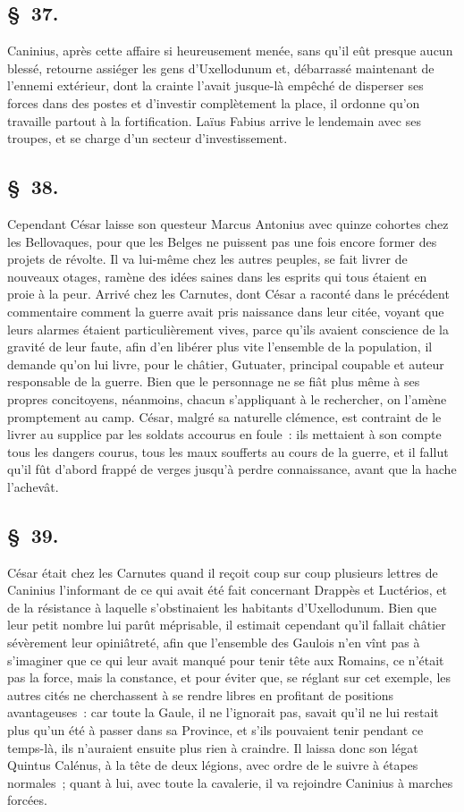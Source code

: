 \documentclass[french,twoside]{book} %
\begin{document}
\subsection[{§ 37.}]{ \textsc{§ 37.} }
\noindent Caninius, après cette affaire si heureusement menée, sans qu’il eût presque aucun blessé, retourne assiéger les gens d’Uxellodunum et, débarrassé maintenant de l’ennemi extérieur, dont la crainte l’avait jusque-là empêché de disperser ses forces dans des postes et d’investir complètement la place, il ordonne qu’on travaille partout à la fortification. Laïus Fabius arrive le lendemain avec ses troupes, et se charge d’un secteur d’investissement.
\subsection[{§ 38.}]{ \textsc{§ 38.} }
\noindent Cependant César laisse son questeur Marcus Antonius avec quinze cohortes chez les Bellovaques, pour que les Belges ne puissent pas une fois encore former des projets de révolte. Il va lui-même chez les autres peuples, se fait livrer de nouveaux otages, ramène des idées saines dans les esprits qui tous étaient en proie à la peur. Arrivé chez les Carnutes, dont César a raconté dans le précédent commentaire comment la guerre avait pris naissance dans leur citée, voyant que leurs alarmes étaient particulièrement vives, parce qu’ils avaient conscience de la gravité de leur faute, afin d’en libérer plus vite l’ensemble de la population, il demande qu’on lui livre, pour le châtier, Gutuater, principal coupable et auteur responsable de la guerre. Bien que le personnage ne se fiât plus même à ses propres concitoyens, néanmoins, chacun s’appliquant à le rechercher, on l’amène promptement au camp. César, malgré sa naturelle clémence, est contraint de le livrer au supplice par les soldats accourus en foule : ils mettaient à son compte tous les dangers courus, tous les maux soufferts au cours de la guerre, et il fallut qu’il fût d’abord frappé de verges jusqu’à perdre connaissance, avant que la hache l’achevât.
\subsection[{§ 39.}]{ \textsc{§ 39.} }
\noindent César était chez les Carnutes quand il reçoit coup sur coup plusieurs lettres de Caninius l’informant de ce qui avait été fait concernant Drappès et Luctérios, et de la résistance à laquelle s’obstinaient les habitants d’Uxellodunum. Bien que leur petit nombre lui parût méprisable, il estimait cependant qu’il fallait châtier sévèrement leur opiniâtreté, afin que l’ensemble des Gaulois n’en vînt pas à s’imaginer que ce qui leur avait manqué pour tenir tête aux Romains, ce n’était pas la force, mais la constance, et pour éviter que, se réglant sur cet exemple, les autres cités ne cherchassent à se rendre libres en profitant de positions avantageuses : car toute la Gaule, il ne l’ignorait pas, savait qu’il ne lui restait plus qu’un été à passer dans sa Province, et s’ils pouvaient tenir pendant ce temps-là, ils n’auraient ensuite plus rien à craindre. Il laissa donc son légat Quintus Calénus, à la tête de deux légions, avec ordre de le suivre à étapes normales ; quant à lui, avec toute la cavalerie, il va rejoindre Caninius à marches forcées.
\end{document}

